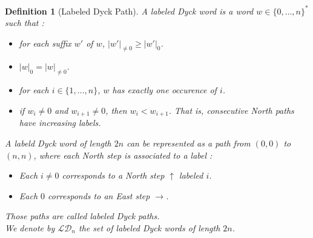 \documentclass[12pt]{report}
\newtheorem{definition}{Definition}
\begin{document}
\begin{definition}[Labeled Dyck Path]
    A \emph{labeled Dyck word} is a word $w \in 
    \{0, \ldots, n\}^*$ such that :
    \begin{itemize}
        \item for each suffix $w'$ of $w$,
            $|w'|_{\neq 0} \geqslant |w'|_0$.
        \item $|w|_0 = |w|_{\neq 0}$.
        \item for each $i \in \{1, \ldots, n\}$, $w$ has 
            exactly one occurence of $i$.
        \item if $w_i \neq 0$ and $w_{i+1} \neq 0$,
            then $w_i < w_{i+1}$. That is, consecutive
            North paths have increasing labels.
    \end{itemize}
    A labeld Dyck word of length $2n$ can be represented
    as a path from $(0,0)$ to $(n,n)$, where each North
    step is associated to a label :
    \begin{itemize}
        \item Each $i \neq 0$ corresponds to a
            \emph{North step} $\uparrow$ labeled $i$.
        \item Each $0$ corresponds to an
            \emph{East step} $\rightarrow$.
    \end{itemize}
    Those paths are called \emph{labeled Dyck paths}.\\
    We denote by $\mathcal{LD}_n$ the set of labeled
    Dyck words of length $2n$.
\end{definition}
\end{document}
